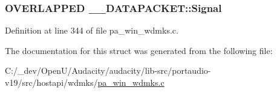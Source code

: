 \subsubsection[{\texorpdfstring{Signal}{Signal}}]{\setlength{\rightskip}{0pt plus 5cm}O\+V\+E\+R\+L\+A\+P\+P\+ED \+\_\+\+\_\+\+D\+A\+T\+A\+P\+A\+C\+K\+E\+T\+::\+Signal}\hypertarget{struct_____d_a_t_a_p_a_c_k_e_t_aa4ee2aff55460a89851b305543017691}{}\label{struct_____d_a_t_a_p_a_c_k_e_t_aa4ee2aff55460a89851b305543017691}


Definition at line 344 of file pa\+\_\+win\+\_\+wdmks.\+c.



The documentation for this struct was generated from the following file\+:\begin{DoxyCompactItemize}
\item 
C\+:/\+\_\+dev/\+Open\+U/\+Audacity/audacity/lib-\/src/portaudio-\/v19/src/hostapi/wdmks/\hyperlink{pa__win__wdmks_8c}{pa\+\_\+win\+\_\+wdmks.\+c}\end{DoxyCompactItemize}
